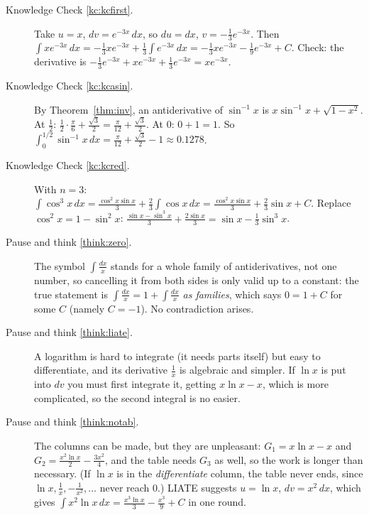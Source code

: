 \documentclass[11pt]{article}
\begin{document}
\begin{description}
  \item[Knowledge Check \ref{kc:kcfirst}.] Take $u=x$, $dv=e^{-3x}\,dx$, so $du=dx$, $v=-\frac13e^{-3x}$. Then $\int xe^{-3x}\,dx=-\frac13xe^{-3x}+\frac13\int e^{-3x}\,dx=-\frac13xe^{-3x}-\frac19e^{-3x}+C$. Check: the derivative is $-\frac13e^{-3x}+xe^{-3x}+\frac13e^{-3x}=xe^{-3x}$.

  \item[Knowledge Check \ref{kc:kcasin}.] By Theorem~\ref{thm:inv}, an antiderivative of $\sin^{-1}x$ is $x\sin^{-1}x+\sqrt{1-x^2}$. At $\frac12$: $\frac12\cdot\frac\pi6+\frac{\sqrt3}2=\frac\pi{12}+\frac{\sqrt3}2$. At $0$: $0+1=1$. So $\int_0^{1/2}\sin^{-1}x\,dx=\frac\pi{12}+\frac{\sqrt3}2-1\approx0.1278$.

  \item[Knowledge Check \ref{kc:kcred}.] With $n=3$: $\int\cos^3x\,dx=\frac{\cos^2x\sin x}3+\frac23\int\cos x\,dx=\frac{\cos^2x\sin x}3+\frac23\sin x+C$. Replace $\cos^2x=1-\sin^2x$: $\frac{\sin x-\sin^3x}3+\frac{2\sin x}3=\sin x-\frac13\sin^3x$.

  \item[Pause and think \ref{think:zero}.] The symbol $\int\frac{dx}x$ stands for a whole family of antiderivatives, not one number, so cancelling it from both sides is only valid up to a constant: the true statement is $\int\frac{dx}x=1+\int\frac{dx}x$ \emph{as families}, which says $0=1+C$ for some $C$ (namely $C=-1$). No contradiction arises.

  \item[Pause and think \ref{think:liate}.] A logarithm is hard to integrate (it needs parts itself) but easy to differentiate, and its derivative $\frac1x$ is algebraic and simpler. If $\ln x$ is put into $dv$ you must first integrate it, getting $x\ln x-x$, which is more complicated, so the second integral is no easier.

  \item[Pause and think \ref{think:notab}.] The columns can be made, but they are unpleasant: $G_1=x\ln x-x$ and $G_2=\frac{x^2\ln x}2-\frac{3x^2}4$, and the table needs $G_3$ as well, so the work is longer than necessary. (If $\ln x$ is in the \emph{differentiate} column, the table never ends, since $\ln x,\frac1x,-\frac1{x^2},\dots$ never reach $0$.) LIATE suggests $u=\ln x$, $dv=x^2\,dx$, which gives $\int x^2\ln x\,dx=\frac{x^3\ln x}3-\frac{x^3}9+C$ in one round.
\end{description}
\end{document}
